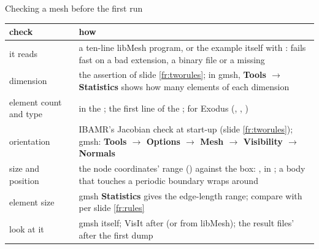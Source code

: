 \documentclass[aspectratio=169,11pt]{beamer}
\begin{document}
\begin{frame}[fragile]{Checking a mesh before the first run}
\label{fr:checks}
\footnotesize
\begin{tabular}{@{}L{0.24\textwidth}L{0.68\textwidth}@{}}
\toprule
check & how \\
\midrule
it reads & a ten-line libMesh program, or the example itself with :  fails fast on a bad extension, a binary file or a missing  \\
dimension & the assertion of slide \ref{fr:tworules}; in gmsh, \textbf{Tools $\to$ Statistics} shows how many elements of each dimension \\
element count and type &  in the ; the first line of the ;  for Exodus (, , ) \\
orientation & IBAMR's Jacobian check at start-up (slide \ref{fr:tworules}); gmsh: \textbf{Tools $\to$ Options $\to$ Mesh $\to$ Visibility $\to$ Normals} \\
size and position & the node coordinates' range () against the box: ,  in ; a body that touches a periodic boundary wraps around \\
element size & gmsh \textbf{Statistics} gives the edge-length range; compare with  per slide \ref{fr:rules} \\
look at it & gmsh itself; VisIt after  (or  from libMesh); the result files'  after the first dump \\
\bottomrule
\end{tabular}

\end{frame}
\end{document}
